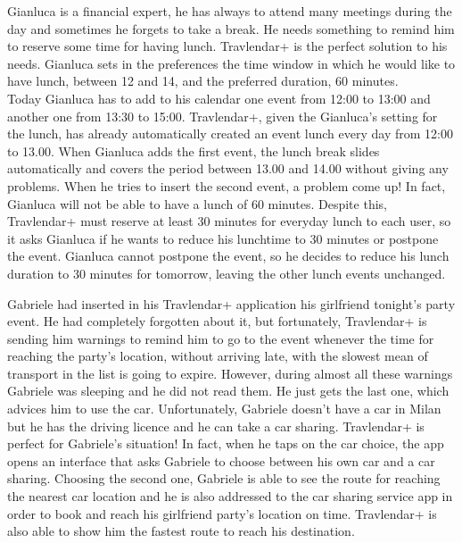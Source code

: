 Gianluca is a financial expert, he has always to attend many meetings during the day and sometimes he forgets to take a break. He needs something to remind him to reserve some time for having lunch. Travlendar+ is the perfect solution to his needs. Gianluca sets in the preferences the time window in which he would like to have lunch, between 12 and 14, and the preferred duration, 60 minutes.\\
Today Gianluca has to add to his calendar one event from 12:00 to 13:00 and another one from 13:30 to 15:00. Travlendar+, given the Gianluca’s setting for the lunch, has already automatically created an event lunch every day from 12:00 to 13.00. When Gianluca adds the first event, the lunch break slides automatically and covers the period between 13.00 and 14.00 without giving any problems. When he tries to insert the second event, a problem come up! In fact, Gianluca will not be able to have a lunch of 60 minutes. Despite this, Travlendar+ must reserve at least 30 minutes for everyday lunch to each user, so it asks Gianluca if he wants to reduce his lunchtime to 30 minutes or postpone the event. Gianluca cannot postpone the event, so he decides to reduce his lunch duration to 30 minutes for tomorrow, leaving the other lunch events unchanged.

\newpage
{}
Gabriele had inserted in his Travlendar+ application his girlfriend tonight’s party event. He had completely forgotten about it, but fortunately, Travlendar+ is sending him warnings to remind him to go to the event whenever the time for reaching the party’s location, without arriving late, with the slowest mean of transport in the list is going to expire. However, during almost all these warnings Gabriele was sleeping and he did not read them. He just gets the last one, which advices him to use the car. Unfortunately, Gabriele doesn’t have a car in Milan but he has the driving licence and he can take a car sharing. Travlendar+ is perfect for Gabriele’s situation! In fact, when he taps on the car choice, the app opens an interface that asks Gabriele to choose between his own car and a car sharing. Choosing the second one, Gabriele is able to see the route for reaching the nearest car location and he is also addressed to the car sharing service app in order to book and reach his girlfriend party’s location on time. Travlendar+ is also able to show him the fastest route to reach his destination.

